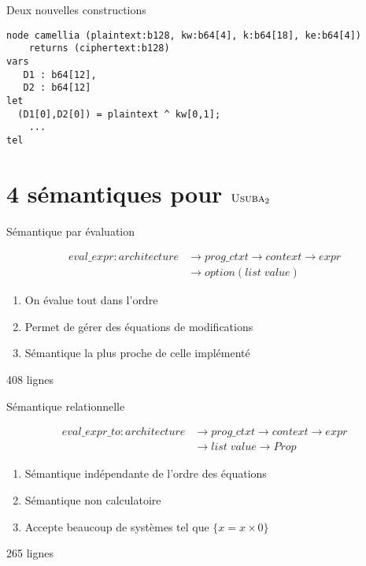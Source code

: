 \documentclass{beamer}
\newcommand{\UsubaB}{$\textsc{Usuba}_2$}
\begin{document}
\begin{frame}[fragile]{Deux nouvelles constructions}
\scriptsize
\begin{lstlisting}
node camellia (plaintext:b128, kw:b64[4], k:b64[18], ke:b64[4])
    returns (ciphertext:b128)
vars
   D1 : b64[12],
   D2 : b64[12]
let
  (D1[0],D2[0]) = plaintext ^ kw[0,1];
    ...
tel
\end{lstlisting}

\normalsize
{}
\end{frame}

\section{4 sémantiques pour \UsubaB{}}


\begin{frame}{Sémantique par évaluation}

\begin{align*}
    eval\_expr : architecture & \rightarrow prog\_ctxt \rightarrow context \rightarrow expr \\
        & \rightarrow option (list \; value)
\end{align*}

\begin{enumerate}
\item On évalue tout dans l'ordre
\item Permet de gérer des équations de modifications
\item Sémantique la plus proche de celle implémenté
\end{enumerate}

408 lignes

\end{frame}

\begin{frame}{Sémantique relationnelle}

\begin{align*}
    eval\_expr\_to : architecture & \rightarrow prog\_ctxt \rightarrow context \rightarrow expr \\
    & \rightarrow list \; value \rightarrow Prop
\end{align*}

\begin{enumerate}
\item Sémantique indépendante de l'ordre des équations
\item Sémantique non calculatoire
\item Accepte beaucoup de systèmes tel que $\{x = x \times 0 \}$
\end{enumerate}

265 lignes

\end{frame}
\end{document}
